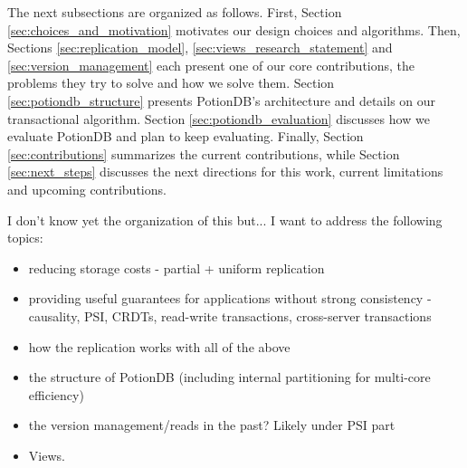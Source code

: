 The next subsections are organized as follows.
First, Section \ref{sec:choices_and_motivation} motivates our design choices and algorithms.
Then, Sections \ref{sec:replication_model}, \ref{sec:views_research_statement} and \ref{sec:version_management} each present one of our core contributions, the problems they try to solve and how we solve them.
Section \ref{sec:potiondb_structure} presents PotionDB's architecture and details on our transactional algorithm.
Section \ref{sec:potiondb_evaluation} discusses how we evaluate PotionDB and plan to keep evaluating.
Finally, Section \ref{sec:contributions} summarizes the current contributions, while Section \ref{sec:next_steps} discusses the next directions for this work, current limitations and upcoming contributions.



I don't know yet the organization of this but... I want to address the following topics:
\begin{itemize}
	\item reducing storage costs - partial + uniform replication
	\item providing useful guarantees for applications without strong consistency - causality, PSI, CRDTs, read-write transactions, cross-server transactions
	\item how the replication works with all of the above
	\item the structure of PotionDB (including internal partitioning for multi-core efficiency)
	\item the version management/reads in the past? Likely under PSI part
	\item Views.
\end{itemize}

